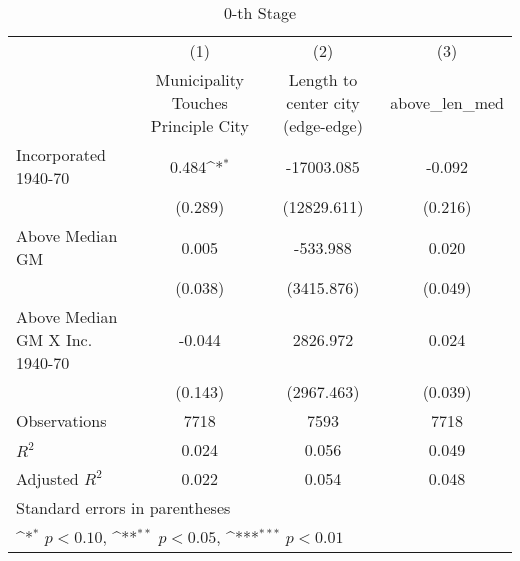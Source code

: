 \begin{table}[htbp]\centering
\def\sym#1{\ifmmode^{#1}\else\(^{#1}\)\fi}
\caption{0-th Stage}
\begin{tabular}{l*{3}{c}}
\hline\hline
                    &\multicolumn{1}{c}{(1)}&\multicolumn{1}{c}{(2)}&\multicolumn{1}{c}{(3)}\\
                    &\multicolumn{1}{c}{Municipality Touches Principle City}&\multicolumn{1}{c}{Length to center city (edge-edge)}&\multicolumn{1}{c}{above\_len\_med}\\
\hline
Incorporated 1940-70&       0.484\sym{*}  &  -17003.085         &      -0.092         \\
                    &     (0.289)         & (12829.611)         &     (0.216)         \\
[1em]
Above Median GM     &       0.005         &    -533.988         &       0.020         \\
                    &     (0.038)         &  (3415.876)         &     (0.049)         \\
[1em]
Above Median GM X Inc. 1940-70&      -0.044         &    2826.972         &       0.024         \\
                    &     (0.143)         &  (2967.463)         &     (0.039)         \\
\hline
Observations        &        7718         &        7593         &        7718         \\
\(R^{2}\)           &       0.024         &       0.056         &       0.049         \\
Adjusted \(R^{2}\)  &       0.022         &       0.054         &       0.048         \\
\hline\hline
\multicolumn{4}{l}{\footnotesize Standard errors in parentheses}\\
\multicolumn{4}{l}{\footnotesize \sym{*} \(p<0.10\), \sym{**} \(p<0.05\), \sym{***} \(p<0.01\)}\\
\end{tabular}
\end{table}
